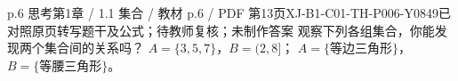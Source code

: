 \par\noindent\begin{minipage}{\linewidth}
\begin{bankitem}{p.6 思考}{第1章 / 1.1 集合 / 教材 p.6 / PDF 第13页}{XJ-B1-C01-TH-P006-Y0849}{已对照原页转写题干及公式；待教师复核；未制作答案}
观察下列各组集合，你能发现两个集合间的关系吗？
$A=\{3,5,7\}$，$B=(2,8]$；
$A=\{\text{等边三角形}\}$，$B=\{\text{等腰三角形}\}$。
\end{bankitem}
\end{minipage}\par\medskip
